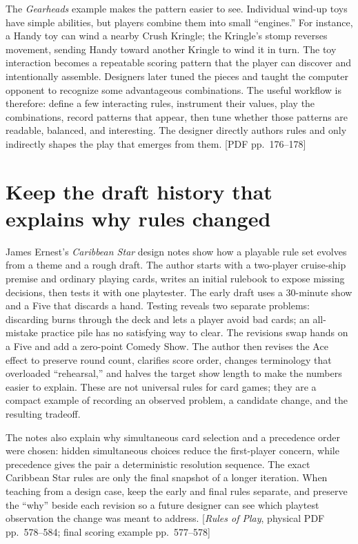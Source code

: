 The \emph{Gearheads} example makes the pattern easier to see. Individual wind-up toys have simple abilities, but players combine them into small ``engines.'' For instance, a Handy toy can wind a nearby Crush Kringle; the Kringle's stomp reverses movement, sending Handy toward another Kringle to wind it in turn. The toy interaction becomes a repeatable scoring pattern that the player can discover and intentionally assemble. Designers later tuned the pieces and taught the computer opponent to recognize some advantageous combinations. The useful workflow is therefore: define a few interacting rules, instrument their values, play the combinations, record patterns that appear, then tune whether those patterns are readable, balanced, and interesting. The designer directly authors rules and only indirectly shapes the play that emerges from them. {[}PDF pp.~176--178{]}

\section{Keep the draft history that explains why rules changed}\label{06-engine-ii-ch047-keep-the-draft-history-that-explains-why-rules-changed}

James Ernest's \emph{Caribbean Star} design notes show how a playable rule set evolves from a theme and a rough draft. The author starts with a two-player cruise-ship premise and ordinary playing cards, writes an initial rulebook to expose missing decisions, then tests it with one playtester. The early draft uses a 30-minute show and a Five that discards a hand. Testing reveals two separate problems: discarding burns through the deck and lets a player avoid bad cards; an all-mistake practice pile has no satisfying way to clear. The revisions swap hands on a Five and add a zero-point Comedy Show. The author then revises the Ace effect to preserve round count, clarifies score order, changes terminology that overloaded ``rehearsal,'' and halves the target show length to make the numbers easier to explain. These are not universal rules for card games; they are a compact example of recording an observed problem, a candidate change, and the resulting tradeoff.

The notes also explain why simultaneous card selection and a precedence order were chosen: hidden simultaneous choices reduce the first-player concern, while precedence gives the pair a deterministic resolution sequence. The exact Caribbean Star rules are only the final snapshot of a longer iteration. When teaching from a design case, keep the early and final rules separate, and preserve the ``why'' beside each revision so a future designer can see which playtest observation the change was meant to address. {[}\emph{Rules of Play}, physical PDF pp.~578--584; final scoring example pp.~577--578{]}

